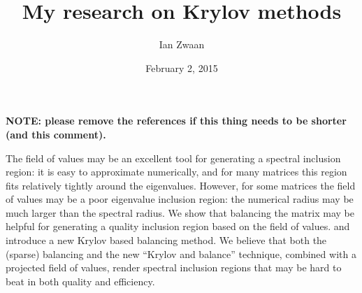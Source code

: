 \documentclass{article}
\title{My research on Krylov methods}
\author{Ian Zwaan}
\affil{PhD student at TU/e}
\date{February 2, 2015}
\begin{document}
\maketitle

\begin{center}
  \bf NOTE: please remove the references if this thing needs to be
  shorter (and this comment).
\end{center}

The field of values may be an excellent tool for generating a spectral
inclusion region: it is easy to approximate numerically, and for many
matrices this region fits relatively tightly around the eigenvalues.
However, for some matrices the field of values may be a poor eigenvalue
inclusion region: the numerical radius may be much larger than the
spectral radius. We show that balancing the matrix may be helpful for
generating a quality inclusion region based on the field of values. and
introduce a new Krylov based balancing method. We believe that both the
(sparse) balancing and the new ``Krylov and balance'' technique,
combined with a projected field of values, render spectral inclusion
regions that may be hard to beat in both quality and efficiency.
\end{document}
